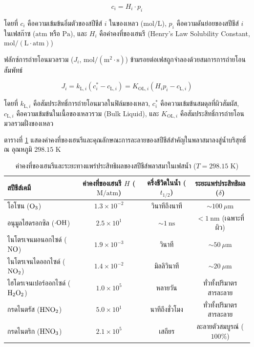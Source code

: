 \begin{equation}
    c_i = H_i \cdot p_i
    \label{eq:henry_law}
\end{equation}

โดยที่ $c_i$ คือความเข้มข้นอิ่มตัวของสปีชีส์ $i$ ในของเหลว ($\text{mol/L}$), $p_i$ คือความดันย่อยของสปีชีส์ $i$ ในเฟสก๊าซ ($\text{atm}$ หรือ $\text{Pa}$), และ $H_i$ คือค่าคงที่ของเฮนรี (Henry's Law Solubility Constant, $\text{mol}/(\text{L}\cdot\text{atm})$) 

ฟลักซ์การถ่ายโอนมวลรวม ($J_i$, $\text{mol}/(\text{m}^2\cdot\text{s})$) ข้ามรอยต่อเฟสถูกจำลองด้วยสมการการถ่ายโอนสัมพัทธ์

\begin{equation}
    J_i = k_{\text{L}, i} (c_i^* - c_{\text{L}, i}) = K_{\text{OL}, i} \left( H_i p_i - c_{\text{L}, i} \right)
    \label{eq:mass_transfer_flux}
\end{equation}

โดยที่ $k_{\text{L}, i}$ คือสัมประสิทธิ์การถ่ายโอนมวลในฟิล์มของเหลว, $c_i^*$ คือความเข้มข้นสมดุลที่ผิวสัมผัส, $c_{\text{L}, i}$ คือความเข้มข้นในเนื้อของเหลวรวม (Bulk Liquid), และ $K_{\text{OL}, i}$ คือสัมประสิทธิ์การถ่ายโอนมวลรวมฝั่งของเหลว

ตารางที่ \ref{tab:henry_constants} แสดงค่าคงที่ของเฮนรีและคุณลักษณะการละลายของสปีชีส์สำคัญในพลาสมาลงสู่น้ำบริสุทธิ์ ณ อุณหภูมิ $298.15 \text{ K}$

\begin{table}[H]
\centering
\small
\caption{ค่าคงที่ของเฮนรีและระยะทางแพร่ประสิทธิผลของสปีชีส์พลาสมาในเฟสน้ำ ($T = 298.15\text{ K}$)}
\label{tab:henry_constants}
\begin{tabular}{lccc}
\toprule
\textbf{สปีชีส์เคมี} & \textbf{ค่าคงที่ของเฮนรี $H$ ($\text{M/atm}$)} & \textbf{ครึ่งชีวิตในน้ำ ($t_{1/2}$)} & \textbf{ระยะแพร่ประสิทธิผล ($\delta$)} \\
\midrule
โอโซน ($\ce{O3}$) & $1.3 \times 10^{-2}$ & วินาทีถึงนาที & $\sim 100 \ \mu\text{m}$ \\
อนุมูลไฮดรอกซิล ($\cdot\ce{OH}$) & $2.5 \times 10^{1}$ & $\sim 1 \ \text{ns}$ & $< 1 \ \text{nm}$ (เฉพาะที่ผิว) \\
ไนโตรเจนมอนอกไซด์ ($\ce{NO}$) & $1.9 \times 10^{-3}$ & วินาที & $\sim 50 \ \mu\text{m}$ \\
ไนโตรเจนไดออกไซด์ ($\ce{NO2}$) & $1.4 \times 10^{-2}$ & มิลลิวินาที & $\sim 20 \ \mu\text{m}$ \\
ไฮโดรเจนเปอร์ออกไซด์ ($\ce{H2O2}$) & $1.0 \times 10^{5}$ & หลายวัน & ทั่วทั้งปริมาตรสารละลาย \\
กรดไนตรัส ($\ce{HNO2}$) & $5.0 \times 10^{1}$ & นาทีถึงชั่วโมง & ทั่วทั้งปริมาตรสารละลาย \\
กรดไนตริก ($\ce{HNO3}$) & $2.1 \times 10^{5}$ & เสถียร & ละลายตัวสมบูรณ์ ($100\%$) \\
\bottomrule
\end{tabular}
\end{table}

